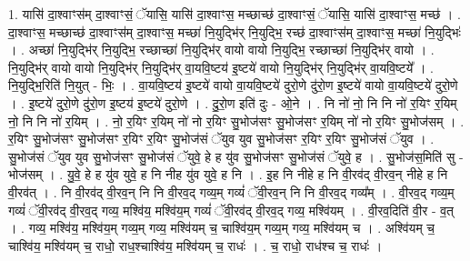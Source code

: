 \documentclass[17pt]{extarticle}
\begin{document}
1. यासि॑ दा॒श्वाꣳस॑म् दा॒श्वाꣳसं॒ ॅयासि॒ यासि॑ दा॒श्वाꣳस॒ मच्छाच्छ॑ दा॒श्वाꣳसं॒ ॅयासि॒ यासि॑ दा॒श्वाꣳस॒ मच्छ॑ । . दा॒श्वाꣳस॒ मच्छाच्छ॑ दा॒श्वाꣳस॑म् दा॒श्वाꣳस॒ मच्छा॑ नि॒युद्भि॑र् नि॒युद्भि॒ रच्छ॑ दा॒श्वाꣳस॑म् दा॒श्वाꣳस॒ मच्छा॑ नि॒युद्भिः॑ । . अच्छा॑ नि॒युद्भि॑र् नि॒युद्भि॒ रच्छाच्छा॑ नि॒युद्भि॑र् वायो वायो नि॒युद्भि॒ रच्छाच्छा॑ नि॒युद्भि॑र् वायो । . नि॒युद्भि॑र् वायो वायो नि॒युद्भि॑र् नि॒युद्भि॑र् वा॒यवि॒ष्टय॑ इ॒ष्टये॑ वायो नि॒युद्भि॑र् नि॒युद्भि॑र् वा॒यवि॒ष्टये᳚ । . नि॒युद्भि॒रिति॑ नि॒युत् - भिः॒ । . वा॒यवि॒ष्टय॑ इ॒ष्टये॑ वायो वा॒यवि॒ष्टये॑ दुरो॒णे दु॑रो॒ण इ॒ष्टये॑ वायो वा॒यवि॒ष्टये॑ दुरो॒णे । . इ॒ष्टये॑ दुरो॒णे दु॑रो॒ण इ॒ष्टय॑ इ॒ष्टये॑ दुरो॒णे । . दु॒रो॒ण इति॑ दुः - ओ॒ने । . नि नो॑ नो॒ नि नि नो॑ र॒यिꣳ र॒यिम् नो॒ नि नि नो॑ र॒यिम् । . नो॒ र॒यिꣳ र॒यिम् नो॑ नो र॒यिꣳ सु॒भोज॑सꣳ सु॒भोज॑सꣳ र॒यिम् नो॑ नो र॒यिꣳ सु॒भोज॑सम् । . र॒यिꣳ सु॒भोज॑सꣳ सु॒भोज॑सꣳ र॒यिꣳ र॒यिꣳ सु॒भोज॑सं ॅयुव युव सु॒भोज॑सꣳ र॒यिꣳ र॒यिꣳ सु॒भोज॑सं ॅयुव । . सु॒भोज॑सं ॅयुव युव सु॒भोज॑सꣳ सु॒भोज॑सं ॅयुवे॒ हे ह यु॑व सु॒भोज॑सꣳ सु॒भोज॑सं ॅयुवे॒ ह । . सु॒भोज॑स॒मिति॑ सु - भोज॑सम् । . यु॒वे॒ हे ह यु॑व युवे॒ ह नि नीह यु॑व युवे॒ ह नि । . इ॒ह नि नीहे ह नि वी॒रव॑द् वी॒रव॒न् नीहे ह नि वी॒रव॑त् । . नि वी॒रव॑द् वी॒रव॒न् नि नि वी॒रव॒द् गव्य॒म् गव्यं॑ ॅवी॒रव॒न् नि नि वी॒रव॒द् गव्य᳚म् । . वी॒रव॒द् गव्य॒म् गव्यं॑ ॅवी॒रव॑द् वी॒रव॒द् गव्य॒ मश्वि॑य॒ मश्वि॑य॒म् गव्यं॑ ॅवी॒रव॑द् वी॒रव॒द् गव्य॒ मश्वि॑यम् । . वी॒रव॒दिति॑ वी॒र - व॒त् । . गव्य॒ मश्वि॑य॒ मश्वि॑य॒म् गव्य॒म् गव्य॒ मश्वि॑यम् च॒ चाश्वि॑य॒म् गव्य॒म् गव्य॒ मश्वि॑यम् च । . अश्वि॑यम् च॒ चाश्वि॑य॒ मश्वि॑यम् च॒ राधो॒ राध॒श्चाश्वि॑य॒ मश्वि॑यम् च॒ राधः॑ । . च॒ राधो॒ राध॑श्च च॒ राधः॑ । \newline
\end{document}
